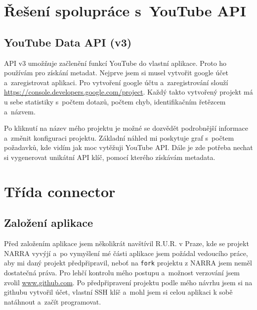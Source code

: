 \section{Řešení spolupráce s~YouTube API}
\subsection{YouTube Data API (v3)}
\par API v3\cite{apiv3} umožňuje začlenění funkcí YouTube do vlastní aplikace. Proto ho používám pro získání metadat. Nejprve jsem si musel vytvořit google účet a~zaregistrovat aplikaci. Pro vytvoření google účtu a~zaregistrování slouží \url{https://console.developers.google.com/project}\cite{googleconsole}. Každý takto vytvořený projekt má u sebe statistiky s~počtem dotazů, počtem chyb, identifikačním řetězcem a~názvem. 
\par Po kliknutí na název mého projektu je možné se dozvědět podrobnější informace a~změnit konfiguraci projektu. Základní náhled mi poskytuje graf s~počtem požadavků, kde vidím jak moc vytěžuji YouTube API\cite{apiv3}. Dále je zde potřeba nechat si vygenerovat unikátní API klíč, pomocí kterého získávám metadata.

\section{Třída connector}
\subsection{Založení aplikace}
\par Před založením aplikace jsem několikrát navštívil R.U.R. v Praze, kde se projekt NARRA vyvýjí a~po vymyšlení mé části aplikace jsem požádal vedoucího práce, aby mi daný projekt předpřipravil, neboť na \texttt{fork} projektu z NARRA jsem neměl dostatečná práva. Pro lehčí kontrolu mého postupu a~možnost verzování jsem zvolil \url{www.github.com}\cite{git}. Po předpřipravení projektu podle mého návrhu jsem si na githubu vytvořil účet, vlastní SSH klíč a~mohl jsem si celou aplikaci k sobě natáhnout a~začít programovat.

